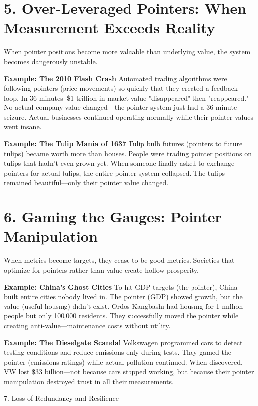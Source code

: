 \documentclass[11pt,oneside]{book}
\begin{document}
\section{5. Over-Leveraged Pointers: When Measurement Exceeds Reality}

When pointer positions become more valuable than underlying value, the system becomes dangerously unstable.

\textbf{Example: The 2010 Flash Crash}
Automated trading algorithms were following pointers (price movements) so quickly that they created a feedback loop. In 36 minutes, \$1 trillion in market value "disappeared" then "reappeared." No actual company value changed—the pointer system just had a 36-minute seizure. Actual businesses continued operating normally while their pointer values went insane.

\textbf{Example: The Tulip Mania of 1637}
Tulip bulb futures (pointers to future tulips) became worth more than houses. People were trading pointer positions on tulips that hadn't even grown yet. When someone finally asked to exchange pointers for actual tulips, the entire pointer system collapsed. The tulips remained beautiful—only their pointer value changed.

\section{6. Gaming the Gauges: Pointer Manipulation}

When metrics become targets, they cease to be good metrics. Societies that optimize for pointers rather than value create hollow prosperity.

\textbf{Example: China's Ghost Cities}
To hit GDP targets (the pointer), China built entire cities nobody lived in. The pointer (GDP) showed growth, but the value (useful housing) didn't exist. Ordos Kangbashi had housing for 1 million people but only 100,000 residents. They successfully moved the pointer while creating anti-value—maintenance costs without utility.

\textbf{Example: The Dieselgate Scandal}
Volkswagen programmed cars to detect testing conditions and reduce emissions only during tests. They gamed the pointer (emissions ratings) while actual pollution continued. When discovered, VW lost \$33 billion—not because cars stopped working, but because their pointer manipulation destroyed trust in all their measurements.

7. Loss of Redundancy and Resilience
\end{document}

